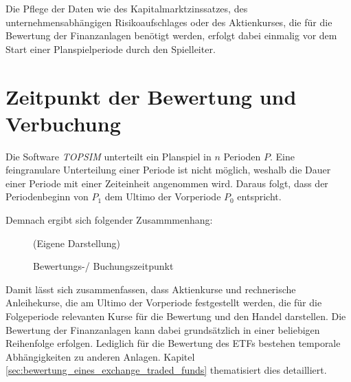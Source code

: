\documentclass[12pt, a4paper]{article}
\theoremstyle{plain}
\begin{document}
Die Pflege der Daten wie des Kapitalmarktzinssatzes, des unternehmensabhängigen Risikoaufschlages oder des Aktienkurses, die für die Bewertung der Finanzanlagen benötigt werden, erfolgt dabei einmalig vor dem Start einer Planspielperiode durch den Spielleiter.

\section{Zeitpunkt der Bewertung und Verbuchung}
\label{sec:zeitpunkt_und_durchfuehrung_der_bewertung_buchung}


Die Software \textit{TOPSIM} unterteilt ein Planspiel in $n$ Perioden $P$.
Eine feingranulare Unterteilung einer Periode ist nicht möglich, weshalb die Dauer einer Periode mit einer Zeiteinheit angenommen wird.
Daraus folgt, dass der Periodenbeginn von $P_1$ dem Ultimo der Vorperiode $P_0$ entspricht.

Demnach ergibt sich folgender Zusammmenhang:

\begin{figure}[htb]
	\centering
	\caption{Bewertungs-/ Buchungszeitpunkt}
	\label{img:zeitstrahl_pewertung}
	(Eigene Darstellung)
\end{figure}

Damit lässt sich zusammenfassen, dass Aktienkurse und rechnerische Anleihekurse, die am Ultimo der Vorperiode festgestellt werden, die für die Folgeperiode relevanten Kurse für die Bewertung und den Handel darstellen.
Die Bewertung der Finanzanlagen kann dabei grundsätzlich in einer beliebigen Reihenfolge erfolgen.
Lediglich für die Bewertung des \glspl{ETF} bestehen temporale Abhängigkeiten zu anderen Anlagen. Kapitel \ref{sec:bewertung_eines_exchange_traded_funds} thematisiert dies detailliert.
\end{document}
